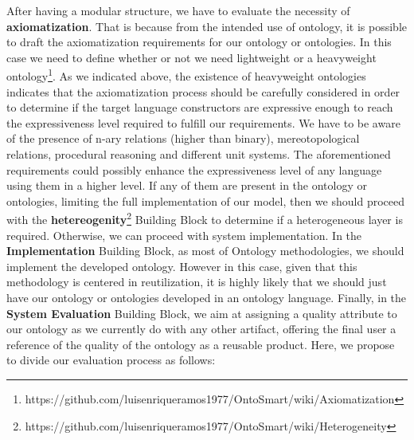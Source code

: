 After having a modular structure, we have to evaluate the necessity of \textbf{axiomatization}. That is because from the intended use of ontology, it is possible to draft the axiomatization requirements for our ontology or ontologies. In this case we need to define whether or not we need lightweight or a heavyweight ontology\footnote{https://github.com/luisenriqueramos1977/OntoSmart/wiki/Axiomatization}. As we indicated above, the existence of heavyweight ontologies indicates that the axiomatization process should be carefully considered in order to determine if the target language constructors are expressive enough to reach the expressiveness level required to fulfill our requirements. We have to be aware of the presence of n-ary relations (higher than binary), mereotopological relations, procedural reasoning and different unit systems. The  aforementioned  requirements  could possibly  enhance the expressiveness level of any language using them in a higher level. If any of them are present in the ontology or ontologies, limiting the full implementation of our model, then we should proceed with the \textbf{hetereogenity}\footnote{https://github.com/luisenriqueramos1977/OntoSmart/wiki/Heterogeneity} Building Block to determine if a heterogeneous layer is required. Otherwise, we can proceed with system implementation. In the \textbf{Implementation} Building Block, as most of Ontology methodologies, we should implement the developed ontology. However in this case, given that this methodology is centered in reutilization, it is highly likely that we should just have our ontology or ontologies developed in an ontology language. Finally, in the \textbf{System Evaluation} Building Block, we aim at assigning a quality attribute to our ontology as we currently do with any other artifact,  offering the final user a reference of the quality of the ontology as a reusable product. Here, we propose to divide our evaluation process as follows:


